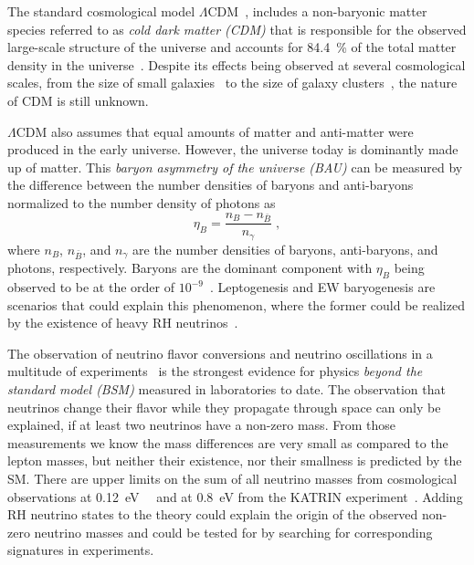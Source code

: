 The standard cosmological model $\Lambda$CDM~, includes a non-baryonic matter species referred to as \textit{cold dark matter (CDM)} that is responsible for the observed large-scale structure of the universe and accounts for \SI{84.4}{\percent} of the total matter density in the universe~. Despite its effects being observed at several cosmological scales, from the size of small galaxies~ to the size of galaxy clusters~, the nature of CDM is still unknown.

$\Lambda$CDM also assumes that equal amounts of matter and anti-matter were produced in the early universe. However, the universe today is dominantly made up of matter. This \textit{baryon asymmetry of the universe (BAU)} can be measured by the difference between the number densities of baryons and anti-baryons normalized to the number density of photons as
\begin{equation}
    \eta_B = \frac{n_B - n_{\bar{B}}}{n_\gamma}
    \;,
\end{equation}
where $n_B$, $n_{\bar{B}}$, and $n_\gamma$ are the number densities of baryons, anti-baryons, and photons, respectively. Baryons are the dominant component with  $\eta_B$ being observed to be at the order of $10^{-9}$~\cite{PDG_review_2022}. Leptogenesis and EW baryogenesis are scenarios that could explain this phenomenon, where the former could be realized by the existence of heavy RH neutrinos~.

The observation of neutrino flavor conversions and neutrino oscillations in a multitude of experiments~ is the strongest evidence for physics \textit{beyond the standard model (BSM)} measured in laboratories to date. The observation that neutrinos change their flavor while they propagate through space can only be explained, if at least two neutrinos have a non-zero mass. From those measurements we know the mass differences are very small as compared to the lepton masses, but neither their existence, nor their smallness is predicted by the SM. There are upper limits on the sum of all neutrino masses from cosmological observations at \SI{0.12}{\electronvolt}~\cite{BOS_nu_masses}~ and at \SI{0.8}{\electronvolt} from the KATRIN experiment~. Adding RH neutrino states to the theory could explain the origin of the observed non-zero neutrino masses and could be tested for by searching for corresponding signatures in experiments.


